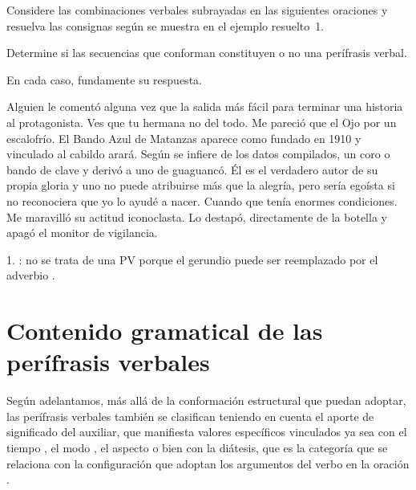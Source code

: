 \begin{ejercicio}\label{ej:11-corpes}
Considere las combinaciones verbales subrayadas en las siguientes oraciones y
resuelva las consignas según se muestra en el ejemplo resuelto~1.

\begin{consignas}
  \item Determine si las secuencias que conforman constituyen o no una perífrasis
        verbal.
  \item En cada caso, fundamente su respuesta.
\end{consignas}

\begin{exe}
  \ex Alguien le comentó alguna vez que la salida más fácil para terminar una
      historia  al protagonista.
  \ex Ves que tu hermana no  del todo.
  \ex Me pareció que el Ojo  por un escalofrío.
  \ex El Bando Azul de Matanzas aparece como fundado en 1910 y vinculado al
      cabildo arará. Según se infiere de los datos compilados,  un coro o bando de clave y derivó a uno de guaguancó.
  \ex Él es el verdadero autor de su propia gloria y uno no puede atribuirse más
      que la alegría, pero sería egoísta si no reconociera que yo lo ayudé a
      nacer. Cuando  que tenía enormes
      condiciones. Me maravilló su actitud iconoclasta.
  \ex Lo destapó,  directamente de la botella y
      apagó el monitor de vigilancia.
\end{exe}


\begin{resuelto}
1. : no se trata de una PV porque el gerundio puede ser
reemplazado por el adverbio .
\end{resuelto}
\end{ejercicio}

\section{Contenido gramatical de las perífrasis verbales}\label{sec:11-contenido}

Según adelantamos, más allá de la conformación estructural que puedan adoptar,
las perífrasis verbales también se clasifican teniendo en cuenta el aporte de
significado del auxiliar, que manifiesta valores específicos vinculados ya sea
con el tiempo , el modo , el
aspecto  o bien con la diátesis, que es la categoría que
se relaciona con la configuración que adoptan los argumentos del verbo en la
oración .

